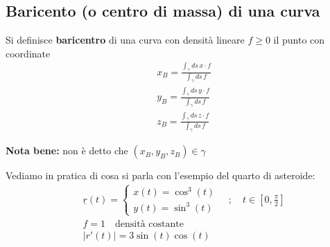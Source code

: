 \newpage

\subsection{Baricento (o centro di massa) di una curva}

Si definisce \textbf{baricentro} di una curva con densità lineare $f\geq 0$ il punto con coordinate
\begin{align}
{}&x_B=\frac{\int_{\gamma}ds \, x\cdot f}{\int_{\gamma}ds \, f} \\
&y_B=\frac{\int_{\gamma}ds \, y\cdot f}{\int_{\gamma}ds \, f} \\
&z_B=\frac{\int_{\gamma}ds \, z\cdot f}{\int_{\gamma}ds \, f}
\end{align}

\textbf{Nota bene:} non è detto che $(x_B,y_B,z_B)\in\gamma$

Vediamo in pratica di cosa si parla con l'esempio del quarto di asteroide:
\begin{align}
{}&\underline{r}(t)=\left\{
\begin{array}{cc}
x(t)=\cos^3(t)\\
y(t)=\sin^3(t)
\end{array}
\right. \quad ; \quad t\in \left[0,\frac{\pi}{2}\right]\\
&f=1 \quad \text{densità costante}\\
&|r'(t)|= 3 \sin(t)\cos(t) 
\end{align}

